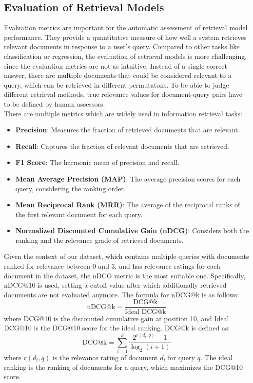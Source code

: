 \subsection{Evaluation of Retrieval Models}\label{sec:evaluation-of-retrieval-models}
Evaluation metrics are important for the automatic assessment of retrieval model performance.
They provide a quantitative measure of how well a system retrieves relevant documents in response to a user's query.
Compared to other tasks like classification or regression, the evaluation of retrieval models is more challenging, since the evaluation metrics are not as intuitive.
Instead of a single correct answer, there are multiple documents that could be considered relevant to a query, which can be retrieved in different permutatons.
To be able to judge different retrieval methods, true relevance values for document-query pairs have to be defined by human assessors.
\\
There are multiple metrics which are widely used in information retrieval tasks:
\begin{itemize}
    \item \textbf{Precision}: Measures the fraction of retrieved documents that are relevant.
    \item \textbf{Recall}: Captures the fraction of relevant documents that are retrieved.
    \item \textbf{F1 Score}: The harmonic mean of precision and recall.
    \item \textbf{Mean Average Precision (MAP)}: The average precision scores for each query, considering the ranking order.
    \item \textbf{Mean Reciprocal Rank (MRR)}: The average of the reciprocal ranks of the first relevant document for each query.
    \item \textbf{Normalized Discounted Cumulative Gain (nDCG)}: Considers both the ranking and the relevance grade of retrieved documents.
\end{itemize}
Given the context of our dataset, which contains multiple queries with documents ranked for relevance between 0 and 3, and has relevance ratings for each document in the dataset, the nDCG metric is the most suitable one.
Specifically, nDCG@10 is used, setting a cutoff value after which additionally retrieved documents are not evaluated anymore.
The formula for nDCG@k is as follows:
\[ \text{nDCG@k} = \frac{\text{DCG@k}}{\text{Ideal DCG@k}} \]
where DCG@10 is the discounted cumulative gain at position 10, and Ideal DCG@10 is the DCG@10 score for the ideal ranking.
DCG@k is defined as:
\[ \text{DCG@k} = \sum_{i=1}^{k} \frac{2^{r(d_i,q)} - 1}{\log_2(i + 1)} \]
where $r(d_i,q)$ is the relevance rating of document $d_i$ for query $q$.
The ideal ranking is the ranking of documents for a query, which maximizes the DCG@10 score.
\\



